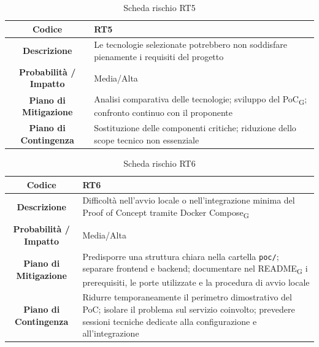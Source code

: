 \begin{table}[H]
	\centering
	\renewcommand{\arraystretch}{1.3}
	\begin{tabularx}{\textwidth}{|c|X|}
		\hline
		\textbf{Codice} & \textbf{RT5} \\
		\hline
		\textbf{Descrizione} & Le tecnologie selezionate potrebbero non soddisfare pienamente i requisiti del progetto \\
		\hline
		\textbf{Probabilità / Impatto} & Media/Alta \\
		\hline
		\textbf{Piano di Mitigazione} & Analisi comparativa delle tecnologie; sviluppo del PoC\textsubscript{G}; confronto continuo con il proponente \\
		\hline
		\textbf{Piano di Contingenza} & Sostituzione delle componenti critiche; riduzione dello scope tecnico non essenziale \\
		\hline
	\end{tabularx}
	\caption{Scheda rischio RT5}
\end{table}

\begin{table}[H]
	\centering
	\renewcommand{\arraystretch}{1.3}
	\begin{tabularx}{\textwidth}{|c|X|}
		\hline
		\textbf{Codice} & \textbf{RT6} \\
		\hline
		\textbf{Descrizione} & Difficoltà nell'avvio locale o nell'integrazione minima del Proof of Concept tramite Docker Compose\textsubscript{G} \\
		\hline
		\textbf{Probabilità / Impatto} & Media/Alta \\
		\hline
		\textbf{Piano di Mitigazione} & Predisporre una struttura chiara nella cartella \texttt{poc/}; separare frontend e backend; documentare nel README\textsubscript{G} i prerequisiti, le porte utilizzate e la procedura di avvio locale \\
		\hline
		\textbf{Piano di Contingenza} & Ridurre temporaneamente il perimetro dimostrativo del PoC; isolare il problema sul servizio coinvolto; prevedere sessioni tecniche dedicate alla configurazione e all'integrazione \\
		\hline
	\end{tabularx}
	\caption{Scheda rischio RT6}
\end{table}

